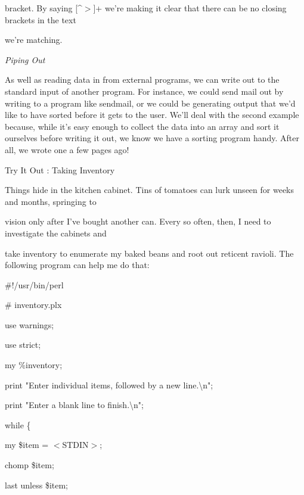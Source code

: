 \documentclass[a4paper,11pt]{book}
\begin{document}
\noindent bracket. By saying  [\^{}$>$]+ we're  making  it  clear  that  there  can  be  no  closing  brackets  in  the  text

\noindent we're matching.

\noindent 

\noindent \textit{Piping Out}

\noindent As well as reading data in from external programs, we can write out to the standard input of another program. For instance, we could send mail out by writing to a program like sendmail, or we could be generating output that we'd like to have sorted before it gets to the user. We'll deal with the second example because, while it's easy enough to collect the data into an array and sort it ourselves before writing it out, we know we have a sorting program handy. After all, we wrote one a few pages ago!

\noindent 

\noindent Try It Out  : Taking Inventory

\noindent 

\noindent 

\noindent Things hide in the kitchen cabinet. Tins of tomatoes can lurk unseen for weeks and months, springing to

\noindent vision only after I've bought another can. Every so often, then, I need to investigate the cabinets and

\noindent take inventory to enumerate my baked beans and root out reticent ravioli. The following program can help me do that:

\noindent 

\noindent 

\noindent \#!/usr/bin/perl

\noindent \# inventory.plx

\noindent use warnings;

\noindent use strict;

\noindent 

\noindent my \%inventory;

\noindent print "Enter individual items, followed by a new line.\textbackslash n";

\noindent print "Enter a blank line to finish.\textbackslash n";

\noindent while \{

\noindent my \$item = $<$STDIN$>$;

\noindent chomp \$item;

\noindent last unless \$item;
\end{document}
